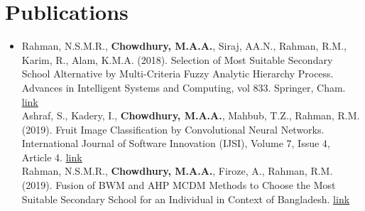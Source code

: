 \documentclass[11pt,a4paper]{article}
\begin{document}
\section{Publications}
 \begin{itemize}[leftmargin=0in, label={}]
    \item{
      Rahman, N.S.M.R., \textbf{Chowdhury, M.A.A.}, Siraj, AA.N., Rahman, R.M., Karim, R., Alam, K.M.A. (2018). Selection of Most Suitable Secondary School Alternative by Multi-Criteria Fuzzy Analytic Hierarchy Process. Advances in Intelligent Systems and Computing, vol 833. Springer, Cham. \href{https://link.springer.com/chapter/10.1007/978-3-319-98678-4_29}{\underline{link}} \\  \vspace{6pt} 
      Ashraf, S., Kadery, I., \textbf{Chowdhury, M.A.A.}, Mahbub, T.Z., Rahman, R.M. (2019). Fruit Image Classification by Convolutional Neural Networks. International Journal of Software Innovation (IJSI), Volume 7, Issue 4, Article 4. \href{https://www.igi-global.com/gateway/article/236206}{\underline{link}} \\  \vspace{6pt} 
      Rahman, N.S.M.R., \textbf{Chowdhury, M.A.A.}, Firoze, A., Rahman, R.M. (2019). Fusion of BWM and AHP MCDM Methods to Choose the Most Suitable Secondary School for an Individual in Context of Bangladesh. \href{https://link.springer.com/chapter/10.1007/978-3-319-98678-4_29}{\underline{link}} \\
    }
 \end{itemize}
 \vspace{-16pt}
\end{document}
